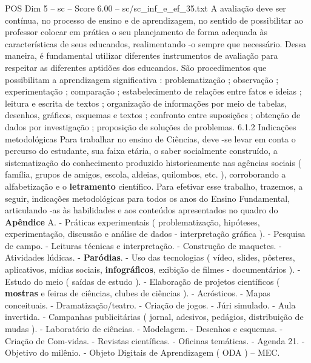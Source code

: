 \begin{textsample}{POS Dim 5 – sc – Score 6.00 – sc/sc\_inf\_e\_ef\_35.txt}
A avaliação deve ser contínua, no processo de ensino e de aprendizagem, no sentido de possibilitar ao professor colocar em prática o seu planejamento de forma adequada às características de seus educandos, realimentando -o sempre que necessário.
Dessa maneira, é fundamental utilizar diferentes instrumentos de avaliação para respeitar as diferentes aptidões dos educandos.
São procedimentos que possibilitam a aprendizagem significativa : problematização ; observação ; experimentação ; comparação ; estabelecimento de relações entre fatos e ideias ; leitura e escrita de textos ; organização de informações por meio de tabelas, desenhos, gráficos, esquemas e textos ; confronto entre suposições ; obtenção de dados por investigação ; proposição de soluções de problemas. 6.1.2 Indicações metodológicas Para trabalhar no ensino de Ciências, deve -se levar em conta o percurso do estudante, sua faixa etária, o saber socialmente construído, a sistematização do conhecimento produzido historicamente nas agências sociais ( família, grupos de amigos, escola, aldeias, quilombos, etc. ), corroborando a alfabetização e o \textbf{letramento} científico.
Para efetivar esse trabalho, trazemos, a seguir, indicações metodológicas para todos os anos do Ensino Fundamental, articulando -as às habilidades e aos conteúdos apresentados no quadro do \textbf{Apêndice} A. - Práticas experimentais ( problematização, hipóteses, experimentação, discussão e análise de dados - interpretação gráfica ). - Pesquisa de campo. - Leituras técnicas e interpretação. - Construção de maquetes. - Atividades lúdicas. - \textbf{Paródias}. - Uso das tecnologias ( vídeo, slides, pôsteres, aplicativos, mídias sociais, \textbf{infográficos}, exibição de filmes - documentários ). - Estudo do meio ( saídas de estudo ). - Elaboração de projetos científicos ( \textbf{mostras} e feiras de ciências, clubes de ciências ). - Acrósticos. - Mapas conceituais. - Dramatização/teatro. - Criação de jogos. - Júri simulado. - Aula invertida. - Campanhas publicitárias ( jornal, adesivos, pedágios, distribuição de mudas ). - Laboratório de ciências. - Modelagem. - Desenhos e esquemas. - Criação de Com-vidas. - Revistas científicas. - Oficinas temáticas. - Agenda 21. - Objetivo do milênio. - Objeto Digitais de Aprendizagem ( ODA ) – MEC.

\end{textsample}
